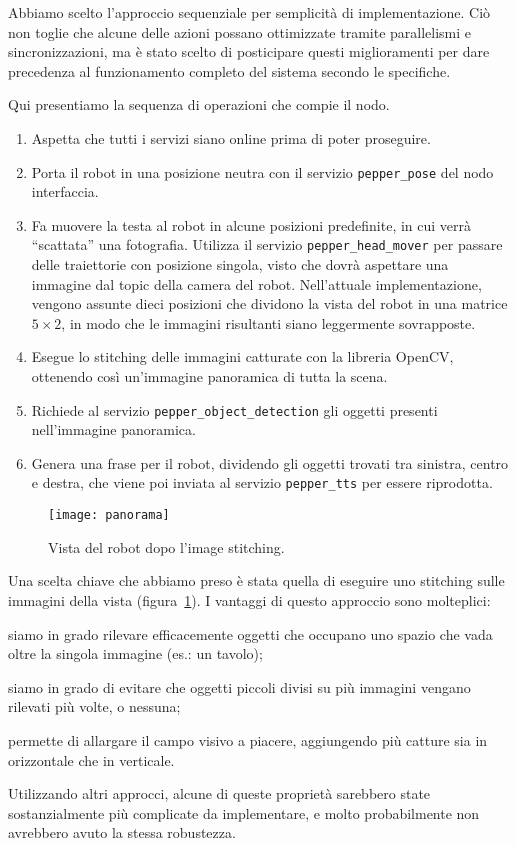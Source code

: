 Abbiamo scelto l'approccio sequenziale per semplicità di implementazione. Ciò non toglie che alcune delle azioni possano ottimizzate tramite parallelismi e sincronizzazioni, ma è stato scelto di posticipare questi miglioramenti per dare precedenza al funzionamento completo del sistema secondo le specifiche.

Qui presentiamo la sequenza di operazioni che compie il nodo.
\begin{enumerate}
	\item Aspetta che tutti i servizi siano online prima di poter proseguire.
	\item Porta il robot in una posizione neutra con il servizio \verb|pepper_pose| del nodo interfaccia. 
	\item Fa muovere la testa al robot in alcune posizioni predefinite, in cui verrà ``scattata'' una fotografia. Utilizza il servizio \verb|pepper_head_mover| per passare delle traiettorie con posizione singola, visto che dovrà aspettare una immagine dal topic della camera del robot. Nell'attuale implementazione, vengono assunte dieci posizioni che dividono la vista del robot in una matrice $5 \times 2$, in modo che le immagini risultanti siano leggermente sovrapposte.
	\item Esegue lo stitching delle immagini catturate con la libreria OpenCV, ottenendo così un'immagine panoramica di tutta la scena.
	\item Richiede al servizio \verb|pepper_object_detection| gli oggetti presenti nell'immagine panoramica.
	\item Genera una frase per il robot, dividendo gli oggetti trovati tra sinistra, centro e destra, che viene poi inviata al servizio \verb|pepper_tts| per essere riprodotta.
\end{enumerate}

\begin{figure}
	\centering
	\texttt{[image: panorama]}
	\caption{Vista del robot dopo l'image stitching.}\label{fig:panorama}
\end{figure}

Una scelta chiave che abbiamo preso è stata quella di eseguire uno stitching sulle immagini della vista (figura~\ref{fig:panorama}). I vantaggi di questo approccio sono molteplici: \begin{enumerate*}[label={(\arabic*)}] \item siamo in grado rilevare efficacemente oggetti che occupano uno spazio che vada oltre la singola immagine (es.\@: un tavolo); \item siamo in grado di evitare che oggetti piccoli divisi su più immagini vengano rilevati più volte, o nessuna; \item permette di allargare il campo visivo a piacere, aggiungendo più catture sia in orizzontale che in verticale.\end{enumerate*} Utilizzando altri approcci, alcune di queste proprietà sarebbero state sostanzialmente più complicate da implementare, e molto probabilmente non avrebbero avuto la stessa robustezza.

